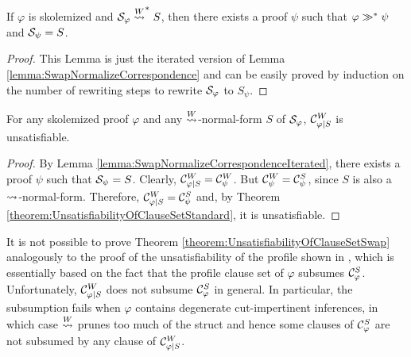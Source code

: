 \documentclass{llncs}
\begin{document}
\begin{lemma}
\label{lemma:SwapNormalizeCorrespondenceIterated}
If $\varphi$ is skolemized and $\mathcal{S}_{\varphi} \stackrel{W}{\leadsto}^* S$, then there exists a proof $\psi$ such that $\varphi \gg^* \psi$ and $\mathcal{S}_{\psi} = S$. 
\end{lemma}
\begin{proof}
This Lemma is just the iterated version of Lemma \ref{lemma:SwapNormalizeCorrespondence} and can be easily proved by induction on the number of rewriting steps to rewrite $\mathcal{S}_{\varphi}$ to $S_{\psi}$.
\end{proof}


\begin{theorem}
\label{theorem:UnsatisfiabilityOfClauseSetSwap}
For any skolemized proof $\varphi$ and any $\stackrel{W}{\leadsto}$-normal-form $S$ of $\mathcal{S}_{\varphi}$, $\mathcal{C}^W_{\varphi|S}$ is unsatisfiable.
\end{theorem}
\begin{proof}
By Lemma \ref{lemma:SwapNormalizeCorrespondenceIterated}, there exists a proof $\psi$ such that $\mathcal{S}_{\psi} = S$. Clearly, $\mathcal{C}^W_{\varphi|S} = \mathcal{C}^{W}_{\psi}$. But $\mathcal{C}^{W}_{\psi} = \mathcal{C}^S_{\psi}$, since $S$ is also a $\leadsto$-normal-form. Therefore, $\mathcal{C}^W_{\varphi|S} = \mathcal{C}^S_{\psi}$ and, by Theorem \ref{theorem:UnsatisfiabilityOfClauseSetStandard}, it is unsatisfiable.
\end{proof}

\begin{remark}
It is not possible to prove Theorem \ref{theorem:UnsatisfiabilityOfClauseSetSwap} analogously to the proof of the unsatisfiability of the profile shown in \cite{Hetzl2007CharacteristicClauseSetsandProofTransformations,Hetzl2008ProofProfiles.CharacteristicClauseSetsandProofTransformations}, which is essentially based on the fact that the profile clause set of $\varphi$ subsumes $\mathcal{C}^S_{\varphi}$. Unfortunately, $\mathcal{C}^W_{\varphi|S}$ does not subsume $\mathcal{C}^S_{\varphi}$ in general. In particular, the subsumption fails when $\varphi$ contains degenerate cut-impertinent inferences, in which case $\stackrel{W}{\leadsto}$ prunes too much of the struct and hence some clauses of $\mathcal{C}^S_{\varphi}$ are not subsumed by any clause of $\mathcal{C}^W_{\varphi|S}$.
\end{remark}
\end{document}
